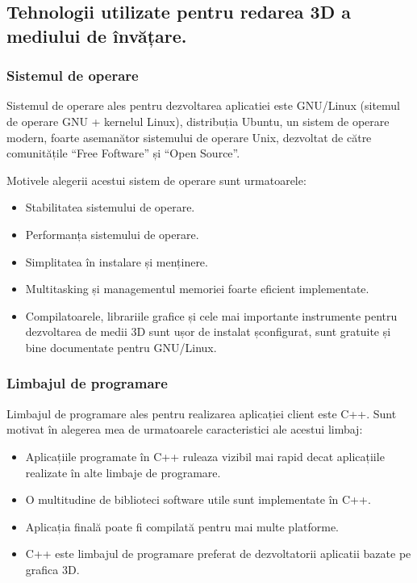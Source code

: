 \subsection{Tehnologii utilizate pentru redarea 3D a mediului de învățare.}
\subsubsection{Sistemul de operare}
\par Sistemul de operare ales pentru dezvoltarea aplicatiei este GNU/Linux (sitemul de operare GNU + kernelul Linux), distribuția Ubuntu, un sistem de operare modern, foarte asemanător sistemului de operare Unix, dezvoltat de către comunitățile “Free Foftware” și “Open Source”.
\par Motivele alegerii acestui sistem de operare sunt urmatoarele: 
\begin{itemize}
\item Stabilitatea sistemului de operare. 
\item Performanța sistemului de operare. 
\item Simplitatea în instalare și menținere.  
\item Multitasking și managementul memoriei foarte eficient implementate.
\item Compilatoarele, librariile grafice și cele mai importante instrumente pentru dezvoltarea de medii 3D sunt ușor de instalat șconfigurat, sunt gratuite și bine documentate pentru GNU/Linux.
\end{itemize}

\subsubsection{Limbajul de programare}

\par Limbajul de programare ales pentru realizarea aplicației client este C++. Sunt motivat în alegerea mea de urmatoarele caracteristici ale acestui limbaj:  
\begin{itemize}
\item Aplicațiile programate în C++ ruleaza vizibil mai rapid decat aplicațiile realizate în alte limbaje de programare.
\item O multitudine de biblioteci software utile sunt implementate în C++.
\item Aplicația finală poate fi compilată pentru mai multe platforme.
\item C++ este limbajul de programare preferat de dezvoltatorii aplicatii bazate pe grafica 3D.
\end{itemize}
     
